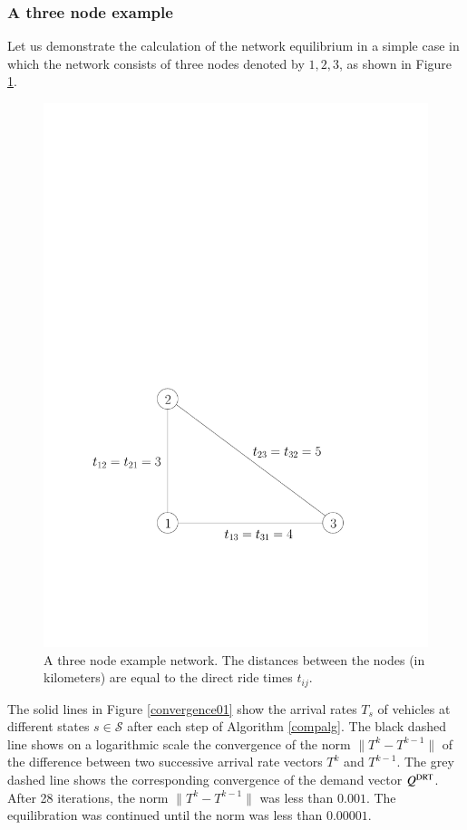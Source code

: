 \documentclass[dissertation,draft*]{aaltoseries}
\begin{document}
\subsubsection{A three node example}
\label{example}
Let us demonstrate the calculation of the network equilibrium in a simple case 
in which the network consists of three nodes denoted by $1,2,3$, as shown in Figure \ref{3node01}. 

\begin{figure}[ht]
\begin{center}
\includegraphics[width=0.4\columnwidth]{3node01}
\caption{A three node example network. The distances between the nodes 
(in kilometers) are equal to the direct ride times $t_{ij}$.}
\label{3node01}
\end{center}
\end{figure}

The solid lines in Figure \ref{convergence01} show the
arrival rates $T_s$ of vehicles at different states $s \in \mathcal{S}$ after each step of Algorithm \ref{compalg}. 
The black dashed line shows on a logarithmic scale the convergence of the norm $\|T^k - T^{k-1}\|$ 
of the difference between two successive arrival rate vectors $T^k$ and $T^{k-1}$.
The grey dashed line shows the corresponding convergence of the demand vector $Q^{\rm DRT}$.
After 28 iterations, the norm $\|T^k - T^{k-1}\|$ was less than $0.001$. 
The equilibration was continued until the norm was less than $0.00001$.
\end{document}
